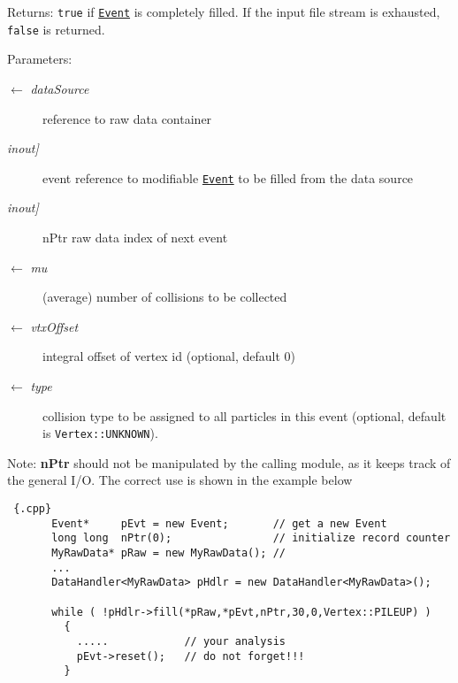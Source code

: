 \begin{Desc}
\item[Returns:]{\tt true} if {\tt \hyperlink{classEvent}{Event}} is completely filled. If the input file stream is exhausted, {\tt false} is returned.\end{Desc}
\begin{Desc}
\item[Parameters:]
\begin{description}
\item[\mbox{$\leftarrow$} {\em data\-Source}]reference to raw data container \item[{\em inout\mbox{]}}]event reference to modifiable {\tt \hyperlink{classEvent}{Event}} to be filled from the data source \item[{\em inout\mbox{]}}]n\-Ptr raw data index of next event \item[\mbox{$\leftarrow$} {\em mu}](average) number of collisions to be collected \item[\mbox{$\leftarrow$} {\em vtx\-Offset}]integral offset of vertex id (optional, default 0) \item[\mbox{$\leftarrow$} {\em type}]collision type to be assigned to all particles in this event (optional, default is {\tt Vertex::UNKNOWN}). \end{description}
\end{Desc}
\begin{Desc}
\item[Note:]{\bf n\-Ptr} should not be manipulated by the calling module, as it keeps track of the general I/O. The correct use is shown in the example below 

\begin{Code}\begin{verbatim} {.cpp}
       Event*     pEvt = new Event;       // get a new Event
       long long  nPtr(0);                // initialize record counter
       MyRawData* pRaw = new MyRawData(); //
       ...
       DataHandler<MyRawData> pHdlr = new DataHandler<MyRawData>();
     
       while ( !pHdlr->fill(*pRaw,*pEvt,nPtr,30,0,Vertex::PILEUP) )
         {
           .....            // your analysis
           pEvt->reset();   // do not forget!!!  
         }
\end{verbatim}\end{Code}

\end{Desc}
